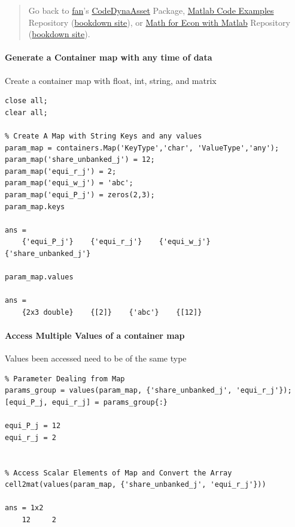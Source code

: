 \documentclass[
]{book}
\begin{document}
\begin{quote}
Go back to \href{http://fanwangecon.github.io/}{fan}'s \href{https://fanwangecon.github.io/CodeDynaAsset/}{CodeDynaAsset} Package, \href{https://fanwangecon.github.io/M4Econ/}{Matlab Code Examples} Repository (\href{https://fanwangecon.github.io/M4Econ/bookdown}{bookdown site}), or \href{https://fanwangecon.github.io/Math4Econ/}{Math for Econ with Matlab} Repository (\href{https://fanwangecon.github.io/Math4Econ/bookdown}{bookdown site}).
\end{quote}

\hypertarget{generate-a-container-map-with-any-time-of-data}{%
\paragraph{Generate a Container map with any time of data}\label{generate-a-container-map-with-any-time-of-data}}

Create a container map with float, int, string, and matrix

\begin{verbatim}
close all;
clear all;

% Create A Map with String Keys and any values
param_map = containers.Map('KeyType','char', 'ValueType','any');
param_map('share_unbanked_j') = 12;
param_map('equi_r_j') = 2;
param_map('equi_w_j') = 'abc';
param_map('equi_P_j') = zeros(2,3);
param_map.keys

ans = 
    {'equi_P_j'}    {'equi_r_j'}    {'equi_w_j'}    {'share_unbanked_j'}

param_map.values

ans = 
    {2x3 double}    {[2]}    {'abc'}    {[12]}
\end{verbatim}

\hypertarget{access-multiple-values-of-a-container-map}{%
\paragraph{Access Multiple Values of a container map}\label{access-multiple-values-of-a-container-map}}

Values been accessed need to be of the same type

\begin{verbatim}
% Parameter Dealing from Map
params_group = values(param_map, {'share_unbanked_j', 'equi_r_j'});
[equi_P_j, equi_r_j] = params_group{:}

equi_P_j = 12
equi_r_j = 2


% Access Scalar Elements of Map and Convert the Array
cell2mat(values(param_map, {'share_unbanked_j', 'equi_r_j'}))

ans = 1x2    
    12     2
\end{verbatim}
\end{document}
